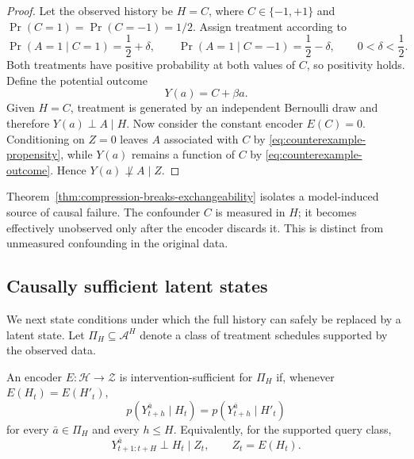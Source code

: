\begin{proof}
Let the observed history be $H=C$, where
$C\in\{-1,+1\}$ and $\Pr(C=1)=\Pr(C=-1)=1/2$. Assign treatment according
to
\begin{equation}
    \Pr(A=1\mid C=1)=\frac12+\delta,
    \qquad
    \Pr(A=1\mid C=-1)=\frac12-\delta,
    \qquad 0<\delta<\frac12.
    \label{eq:counterexample-propensity}
\end{equation}
Both treatments have positive probability at both values of $C$, so
positivity holds. Define the potential outcome
\begin{equation}
    Y(a)=C+\beta a.
    \label{eq:counterexample-outcome}
\end{equation}
Given $H=C$, treatment is generated by an independent Bernoulli draw and
therefore $Y(a)\perp A\mid H$. Now consider the constant encoder
$E(C)=0$. Conditioning on $Z=0$ leaves $A$ associated with $C$ by
\eqref{eq:counterexample-propensity}, while $Y(a)$ remains a function of
$C$ by \eqref{eq:counterexample-outcome}. Hence
$Y(a)\not\perp A\mid Z$.
\end{proof}

Theorem~\ref{thm:compression-breaks-exchangeability} isolates a
model-induced source of causal failure. The confounder $C$ is measured in
$H$; it becomes effectively unobserved only after the encoder discards
it. This is distinct from unmeasured confounding in the original data.

\subsection{Causally sufficient latent states}
\label{sec:causal-state-definition}

We next state conditions under which the full history can safely be
replaced by a latent state. Let $\Pi_H\subseteq\mathcal A^H$ denote a
class of treatment schedules supported by the observed data.

\begin{definition}
\label{def:intervention-sufficient}
An encoder $E:\mathcal H\rightarrow\mathcal Z$ is intervention-sufficient
for $\Pi_H$ if, whenever $E(H_t)=E(H'_t)$,
\begin{equation}
    p\!\left(Y_{t+h}^{\bar a}\mid H_t\right)
    =
    p\!\left(Y_{t+h}^{\bar a}\mid H'_t\right)
    \label{eq:intervention-sufficiency}
\end{equation}
for every $\bar a\in\Pi_H$ and every $h\leq H$.
Equivalently, for the supported query class,
\begin{equation}
    Y_{t+1:t+H}^{\bar a}\perp H_t\mid Z_t,
    \qquad Z_t=E(H_t).
    \label{eq:outcome-sufficiency}
\end{equation}
\end{definition}


